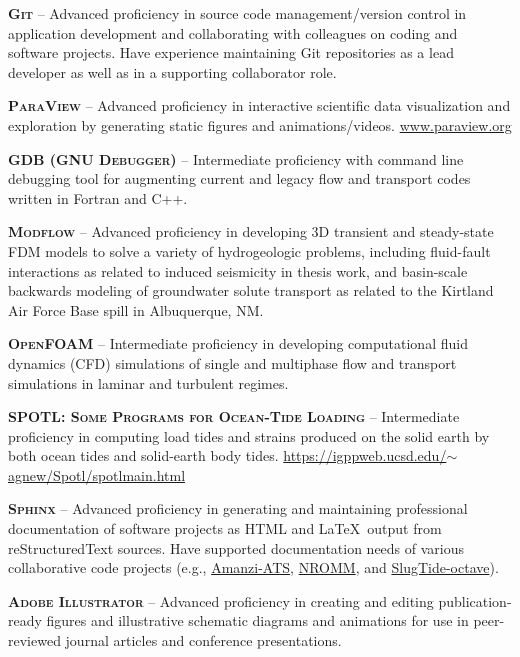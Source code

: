 \documentclass[11pt, letterpaper]{article}
\begin{document}
\textbf{\textsc{Git}} -- Advanced proficiency in source code management/version control
in application development and collaborating with colleagues on coding and software
projects. Have experience maintaining Git repositories as a lead developer as
well as in a supporting collaborator role.

\textbf{\textsc{ParaView}} -- Advanced proficiency in interactive scientific
data visualization and exploration by generating static figures and
animations/videos. \href{https://www.paraview.org/}{www.paraview.org} 

\textbf{\textsc{GDB (GNU Debugger)}} -- Intermediate proficiency with command
line debugging tool for augmenting current and legacy flow and transport codes
written in Fortran and C++.

\textbf{\textsc{Modflow}} -- Advanced proficiency in developing 3D transient
and steady-state FDM models to solve a variety of hydrogeologic problems, 
including fluid-fault interactions as related to induced seismicity in thesis
work, and basin-scale backwards modeling of groundwater solute transport as
related to the Kirtland Air Force Base spill in Albuquerque, NM.

\textbf{\textsc{OpenFOAM}} -- Intermediate proficiency in developing
computational fluid dynamics (CFD) simulations of single and multiphase flow
and transport simulations in laminar and turbulent regimes.

\textbf{\textsc{SPOTL: Some Programs for Ocean-Tide Loading}} -- Intermediate
proficiency in computing load tides and strains produced on the solid earth by
both ocean tides and solid-earth body tides.
\href{https://igppweb.ucsd.edu/~agnew/Spotl/spotlmain.html}{https://igppweb.ucsd.edu/\(\sim \)agnew/Spotl/spotlmain.html}

\textbf{\textsc{Sphinx}} -- Advanced proficiency in generating and maintaining
professional documentation of software projects as HTML and \LaTeX \ output
from reStructuredText sources. Have supported documentation needs of various
collaborative code projects %
(e.g., \href{https://github.com/amanzi/amanzi}{Amanzi-ATS},
\href{https://gitlab.lanl.gov/jportiz/nromm_user_guide}{NROMM}, and
\href{https://github.com/johnportiz14/SlugTide-octave}{SlugTide-octave}).

\textbf{\textsc{Adobe Illustrator}} -- Advanced proficiency in creating and editing
publication-ready figures and illustrative schematic diagrams and animations for use in peer-reviewed journal articles and conference presentations.
\end{document}

